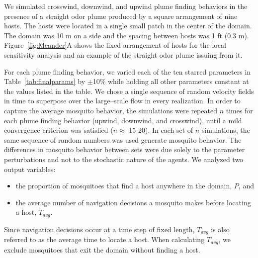 \documentclass[10pt]{article}
\begin{document}
We simulated crosswind, downwind, and upwind plume finding behaviors in the presence of a straight odor plume produced by a square arrangement of nine hosts. The hosts were located in a single small patch in the center of the domain. The domain was 10 m on a side and the spacing between hosts was 1 ft (0.3 m). Figure~\ref{fig:Meander}A shows the fixed arrangement of hosts for the local sensitivity analysis and an example of the straight odor plume issuing from it.

For each plume finding behavior, we varied each of the ten starred parameters in Table~\ref{tab:finalparams} by $\pm$10\% while holding all other parameters constant at the values listed in the table. We chose a single sequence of random velocity fields in time to superpose over the large--scale flow in every realization. In order to capture the average mosquito behavior, the simulations were repeated $n$ times for each plume finding behavior (upwind, downwind, and crosswind), until a mild convergence criterion was satisfied ($n \approx$ 15-20). In each set of $n$ simulations, the same sequence of random numbers was used generate mosquito behavior. The differences in mosquito behavior between sets were due solely to the parameter perturbations and not to the stochastic nature of the agents.
%
We analyzed two output variables:
\begin{itemize}
\item the proportion of mosquitoes that find a host anywhere in the domain, $P$, and
\item the average number of navigation decisions a mosquito makes before locating a host, $T_{avg}$.
\end{itemize}
Since navigation decisions occur at a time step of fixed length, $T_{avg}$ is also referred to as the average time to locate a host. When calculating $T_{avg}$, we exclude mosquitoes that exit the domain without finding a host.
\end{document}
